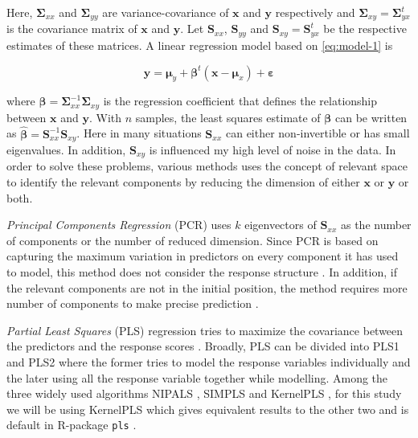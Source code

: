\documentclass[12pt,3p,authoryear]{elsarticle}
\begin{document}
Here, \(\boldsymbol{\Sigma}_{xx}\) and \(\boldsymbol{\Sigma}_{yy}\) are variance-covariance of \(\mathbf{x}\) and \(\mathbf{y}\) respectively and \(\boldsymbol{\Sigma}_{xy}=\boldsymbol{\Sigma}_{yx}^t\) is the covariance matrix of \(\mathbf{x}\) and \(\mathbf{y}\). Let \(\mathbf{S}_{xx}\), \(\mathbf{S}_{yy}\) and \(\mathbf{S}_{xy}=\mathbf{S}_{yx}^t\) be the respective estimates of these matrices. A linear regression model based on \eqref{eq:model-1} is

\begin{equation}
\mathbf{y} = \boldsymbol{\mu}_y + \boldsymbol{\beta}^t\left( \mathbf{x} - \boldsymbol{\mu}_{x} \right) + \boldsymbol{\varepsilon}
\label{eq:reg-model}
\end{equation}

where \(\boldsymbol{\beta}=\boldsymbol{\Sigma}_{xx}^{-1}\boldsymbol{\Sigma}_{xy}\)
is the regression coefficient that defines the relationship between \(\mathbf{x}\)
and \(\mathbf{y}\). With \(n\) samples, the least squares estimate of \(\boldsymbol{\beta}\) can be written as \(\boldsymbol{\hat{\beta}}=\mathbf{S}_{xx}^{-1}\mathbf{S}_{xy}\). Here in many situations \(\mathbf{S}_{xx}\) can either non-invertible or has small eigenvalues. In addition, \(\mathbf{S}_{xy}\) is influenced my high level of noise in the data. In order to solve these problems, various methods uses the concept of relevant space to identify the relevant components by reducing the dimension of either \(\mathbf{x}\) or \(\mathbf{y}\) or both.

\emph{Principal Components Regression} (PCR) uses \(k\) eigenvectors of \(\mathbf{S}_{xx}\) as the number of components or the number of reduced dimension. Since PCR is based on capturing the maximum variation in predictors on every component it has used to model, this method does not consider the response structure \citep{Jolliffe2002}. In addition, if the relevant components are not in the initial position, the method requires more number of components to make precise prediction \citep{Alm_y_1996}.

\emph{Partial Least Squares} (PLS) regression tries to maximize the covariance between the predictors and the response scores \citep{DeJong1993}. Broadly, PLS can be divided into PLS1 and PLS2 where the former tries to model the response variables individually and the later using all the response variable together while modelling. Among the three widely used algorithms NIPALS \citep{wold75nipals}, SIMPLS \citep{DeJong1993} and KernelPLS \citep{Lindgren_1993}, for this study we will be using KernelPLS which gives equivalent results to the other two and is default in R-package \texttt{pls} \citep{mevik07_thepl}.
\end{document}
